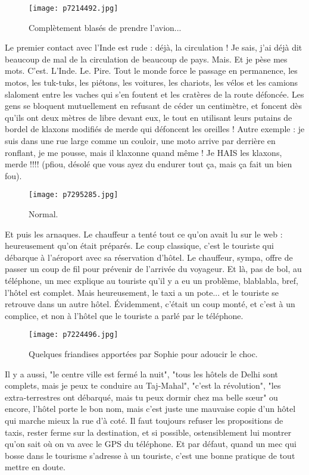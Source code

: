 \documentclass{book}
\begin{document}
\begin{figure}[h]
\centering
\texttt{[image: p7214492.jpg]}
\caption*{Complètement blasés de prendre l'avion...}
\end{figure}

Le premier contact avec l'Inde est rude : déjà, la circulation ! Je sais, j'ai déjà dit beaucoup de mal de la circulation de beaucoup de pays. Mais. Et je pèse mes mots. C'est. L'Inde. Le. Pire. Tout le monde force le passage en permanence, les motos, les tuk-tuks, les piétons, les voitures, les chariots, les vélos et les camions slaloment entre les vaches qui s'en foutent et les cratères de la route défoncée. Les gens se bloquent mutuellement en refusant de céder un centimètre, et foncent dès qu'ils ont deux mètres de libre devant eux, le tout en utilisant leurs putains de bordel de klaxons modifiés de merde qui défoncent les oreilles ! Autre exemple : je suis dans une rue large comme un couloir, une moto arrive par derrière en ronflant, je me pousse, mais il klaxonne quand même ! Je HAIS les klaxons, merde !!!! (pfiou, désolé que vous ayez du endurer tout ça, mais ça fait un bien fou).


\begin{figure}[h]
\centering
\texttt{[image: p7295285.jpg]}
\caption*{Normal.}
\end{figure}

Et puis les arnaques. Le chauffeur a tenté tout ce qu'on avait lu sur le web : heureusement qu'on était préparés. Le coup classique, c'est le touriste qui débarque à l'aéroport avec sa réservation d'hôtel. Le chauffeur, sympa, offre de passer un coup de fil pour prévenir de l'arrivée du voyageur. Et là, pas de bol, au téléphone, un mec explique au touriste qu'il y a eu un problème, blablabla, bref, l'hôtel est complet. Mais heureusement, le taxi a un pote... et le touriste se retrouve dans un autre hôtel. Évidemment, c'était un coup monté, et c'est à un complice, et non à l'hôtel que le touriste a parlé par le téléphone.


\begin{figure}[h]
\centering
\texttt{[image: p7224496.jpg]}
\caption*{Quelques friandises apportées par Sophie pour adoucir le choc.}
\end{figure}

Il y a aussi, "le centre ville est fermé la nuit", "tous les hôtels de Delhi sont complets, mais je peux te conduire au Taj-Mahal", "c'est la révolution", "les extra-terrestres ont débarqué, mais tu peux dormir chez ma belle sœur" ou encore, l'hôtel porte le bon nom, mais c'est juste une mauvaise copie d'un hôtel qui marche mieux la rue d'à coté. Il faut toujours refuser les propositions de taxis, rester ferme sur la destination, et si possible, ostensiblement lui montrer qu'on sait où on va avec le GPS du téléphone. Et par défaut, quand un mec qui bosse dans le tourisme s'adresse à un touriste, c'est une bonne pratique de tout mettre en doute.
\end{document}

